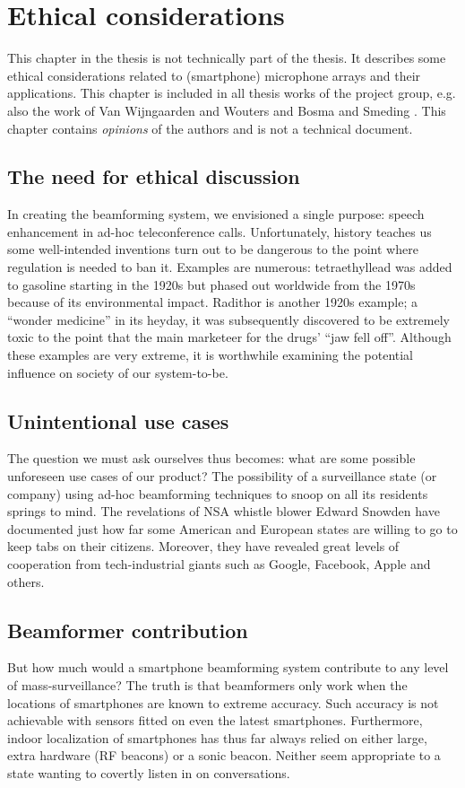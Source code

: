 \chapter{Ethical considerations}
\label{app:ethical}

This chapter in the thesis is not technically part of the thesis.
It describes some ethical considerations related to (smartphone) microphone arrays and their applications.
This chapter is included in all thesis works of the project group, e.g. also the work of Van Wijngaarden and Wouters \cite{BAP:ErikNiels} and Bosma and Smeding \cite{BAP:RoySjoerd}. This chapter contains \emph{opinions} of the authors and is not a technical document.

\section{The need for ethical discussion}
In creating the beamforming system, we envisioned a single purpose: speech enhancement in ad-hoc teleconference calls. Unfortunately, history teaches us some well-intended inventions turn out to be dangerous to the point where regulation is needed to ban it. Examples are numerous: tetraethyllead was added to gasoline starting in the 1920s but phased out worldwide from the 1970s because of its environmental impact. Radithor is another 1920s example; a ``wonder medicine'' in its heyday, it was subsequently discovered to be extremely toxic to the point that the main marketeer for the drugs' ``jaw fell off''.
Although these examples are very extreme, it is worthwhile examining the potential influence on society of our system-to-be.

\section{Unintentional use cases}
The question we must ask ourselves thus becomes: what are some possible unforeseen use cases of our product? The possibility of a surveillance state (or company) using ad-hoc beamforming techniques to snoop on all its residents springs to mind. The revelations of NSA whistle blower Edward Snowden have documented just how far some American and European states are willing to go to keep tabs on their citizens. Moreover, they have revealed great levels of cooperation from tech-industrial giants such as Google, Facebook, Apple and others.

\section{Beamformer contribution}
But how much would a smartphone beamforming system contribute to any level of mass-surveillance? The truth is that beamformers only work when the locations of smartphones are known to extreme accuracy. Such accuracy is not achievable with sensors fitted on even the latest smartphones. Furthermore, indoor localization of smartphones has thus far always relied on either large, extra hardware (RF beacons) or a sonic beacon. Neither seem appropriate to a state wanting to covertly listen in on conversations.

